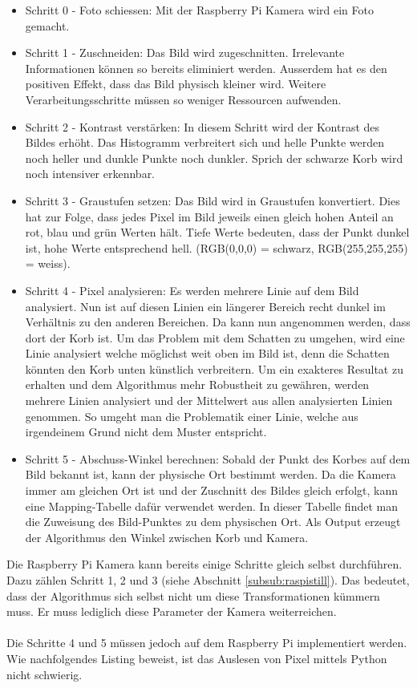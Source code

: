 \begin{itemize}
	\item Schritt 0 - Foto schiessen: Mit der Raspberry Pi Kamera wird ein Foto gemacht.
	
	\item Schritt 1 - Zuschneiden: Das Bild wird zugeschnitten. Irrelevante Informationen können so bereits eliminiert werden. Ausserdem hat es den positiven Effekt, dass das Bild physisch kleiner wird. Weitere Verarbeitungsschritte müssen so weniger Ressourcen aufwenden. 
	
	\item Schritt 2 - Kontrast verstärken: In diesem Schritt wird der Kontrast des Bildes erhöht. Das Histogramm verbreitert sich und helle Punkte werden noch heller und dunkle Punkte noch dunkler. Sprich der schwarze Korb wird noch intensiver erkennbar. 
	
	\item Schritt 3 - Graustufen setzen: Das Bild wird in Graustufen konvertiert. Dies hat zur Folge, dass jedes Pixel im Bild jeweils einen gleich hohen Anteil an rot, blau und grün Werten hält. Tiefe Werte bedeuten, dass der Punkt dunkel ist, hohe Werte entsprechend hell. (RGB(0,0,0) = schwarz, RGB(255,255,255) = weiss).
	
	\item Schritt 4 - Pixel analysieren: Es werden mehrere Linie auf dem Bild analysiert. Nun ist auf diesen Linien ein längerer Bereich recht dunkel im Verhältnis zu den anderen Bereichen. Da kann nun angenommen werden, dass dort der Korb ist. Um das Problem mit dem Schatten zu umgehen, wird eine Linie analysiert welche möglichst weit oben im Bild ist, denn die Schatten könnten den Korb unten künstlich verbreitern. Um ein exakteres Resultat zu erhalten und dem Algorithmus mehr Robustheit zu gewähren, werden mehrere Linien analysiert und der Mittelwert aus allen analysierten Linien genommen. So umgeht man die Problematik einer Linie, welche aus irgendeinem Grund nicht dem Muster entspricht.
	
	\item Schritt 5 - Abschuss-Winkel berechnen: Sobald der Punkt des Korbes auf dem Bild bekannt ist, kann der physische Ort bestimmt werden. Da die Kamera immer am gleichen Ort ist und der Zuschnitt des Bildes gleich erfolgt, kann eine Mapping-Tabelle dafür verwendet werden. In dieser Tabelle findet man die Zuweisung des Bild-Punktes zu dem physischen Ort. Als Output erzeugt der Algorithmus den Winkel zwischen Korb und Kamera.
\end{itemize} 
Die Raspberry Pi Kamera kann bereits einige Schritte gleich selbst durchführen. Dazu zählen Schritt 1, 2 und 3 (siehe Abschnitt \ref{subsub:raspistill}). Das bedeutet, dass der Algorithmus sich selbst nicht um diese Transformationen kümmern muss. Er muss lediglich diese Parameter der Kamera weiterreichen.\\
\\
Die Schritte 4 und 5 müssen jedoch auf dem Raspberry Pi implementiert werden. Wie nachfolgendes Listing beweist, ist das Auslesen von Pixel mittels Python nicht schwierig.

